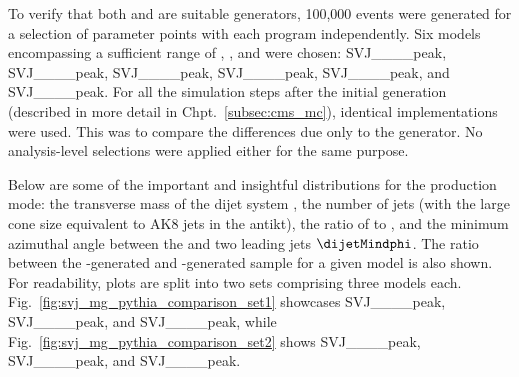 To verify that both \PYTHIA and \MADGRAPH are suitable generators, 100,000 events were generated for a selection of parameter points with each program independently. Six models encompassing a sufficient range of \mZprime, \mDark, and \rinv were chosen: SVJ\_\_\_\_\-peak, SVJ\_\_\_\_peak, SVJ\_\_\_\_\-peak, SVJ\_\_\_\_\-peak, SVJ\_\_\_\_\-peak, and SVJ\_\_\_\_\-peak. For all the simulation steps after the initial generation (described in more detail in Chpt.~\ref{subsec:cms_mc}), identical implementations were used. This was to compare the differences due only to the generator. No analysis-level selections were applied either for the same purpose.

Below are some of the important and insightful distributions for the \schannel production mode: the transverse mass of the dijet system \mT, the number of jets (with the large cone size equivalent to AK8 jets in the \gls{antikt}), the ratio of \MET to \mT, and the minimum azimuthal angle between the \MET and two leading \glspl{jet} $\dijetMindphi$. The ratio between the \MADGRAPH-generated and \PYTHIA-generated sample for a given model is also shown. For readability, plots are split into two sets comprising three models each. Fig.~\ref{fig:svj_mg_pythia_comparison_set1} showcases SVJ\_\_\_\_\-peak, SVJ\_\_\_\_\-peak, and SVJ\_\_\_\_\-peak, while Fig.~\ref{fig:svj_mg_pythia_comparison_set2} shows SVJ\_\_\_\_\-peak, SVJ\_\_\_\_\-peak, and SVJ\_\_\_\_\-peak.

